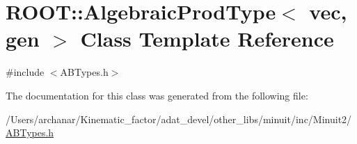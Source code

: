 \hypertarget{classROOT_1_1Minuit2_1_1AlgebraicProdType_3_01vec_00_01gen_01_4}{}\section{R\+O\+OT\+:\+:Algebraic\+Prod\+Type$<$ vec, gen $>$ Class Template Reference}
\label{classROOT_1_1Minuit2_1_1AlgebraicProdType_3_01vec_00_01gen_01_4}


{\ttfamily \#include $<$A\+B\+Types.\+h$>$}



The documentation for this class was generated from the following file\+:\begin{DoxyCompactItemize}
\item 
/\+Users/archanar/\+Kinematic\+\_\+factor/adat\+\_\+devel/other\+\_\+libs/minuit/inc/\+Minuit2/\mbox{\hyperlink{other__libs_2minuit_2inc_2Minuit2_2ABTypes_8h}{A\+B\+Types.\+h}}\end{DoxyCompactItemize}
